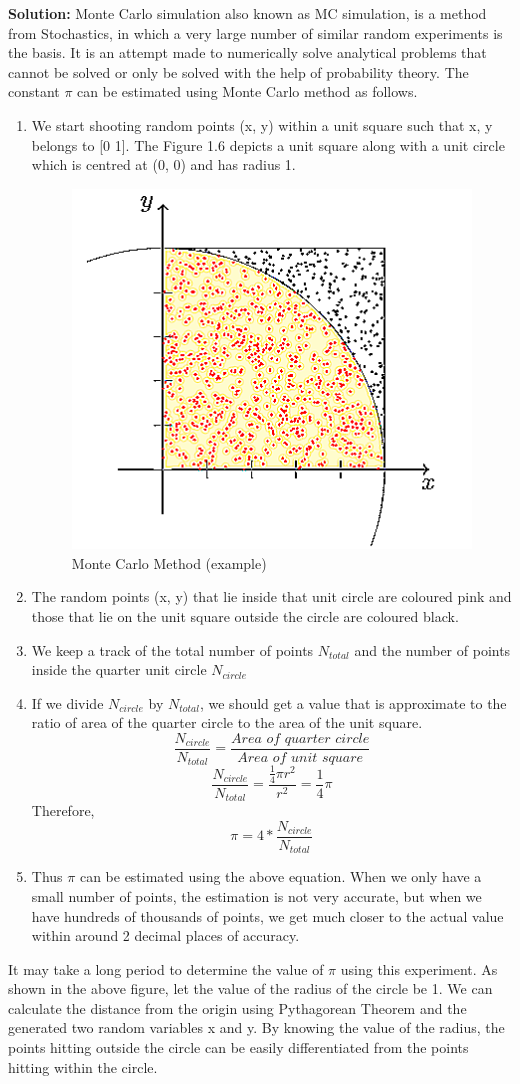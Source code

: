 \noindent \textbf{Solution:} Monte Carlo simulation also known as MC simulation, is a method from Stochastics, in which a very large number of similar random experiments is the basis. It is an attempt made to numerically solve analytical problems that cannot be solved or only be solved with the help of probability theory. The constant $\pi$ can be estimated using Monte Carlo method as follows.
\begin{enumerate}
  \item We start shooting random points (x, y) within a unit square such that x, y belongs to [0 1]. The Figure 1.6 depicts a unit square along with a unit circle which is centred at (0, 0) and has radius 1.
   \begin{figure}[H]
    \centering
    \includegraphics[width = .5\linewidth]{monte.png}
    \caption{Monte Carlo Method (example)}
  \end{figure}
 \item The random points (x, y) that lie inside that unit circle are coloured pink and those that lie on the unit square outside the circle are coloured black.
   \item We keep a track of the total number of points $N_{total}$ and the number of points inside the quarter unit circle $N_{circle}$
  \item If we divide $N_{circle}$ by $N_{total}$, we should get a value that is approximate to the ratio of area of the quarter circle to the area of the unit square. 
  $$\frac{N_{circle}}{N_{total}} =  \frac{\textit{Area of quarter circle}}{\textit{Area of unit square}}$$
$$\frac{N_{circle}}{N_{total}}= \frac{\frac{1}{4}\pi r^2}{r^2} = \frac{1}{4}\pi$$
\noindent Therefore,
$$\pi = 4*\frac{N_{circle}}{N_{total}}$$
 \item Thus $\pi$ can be estimated using the above equation. When we only have a small number of points, the estimation is not very accurate, but when we have hundreds of thousands of points, we get much closer to the actual value within around 2 decimal places of accuracy.
\end{enumerate}
\noindent It may take a long period to determine the value of $\pi$ using this experiment. As shown in the above figure, let the value of the radius of the circle be 1. We can calculate the distance from the origin using Pythagorean Theorem and the generated two random variables x and y. By knowing the value of the radius, the points hitting outside the circle can be easily differentiated from the points hitting within the circle. 

